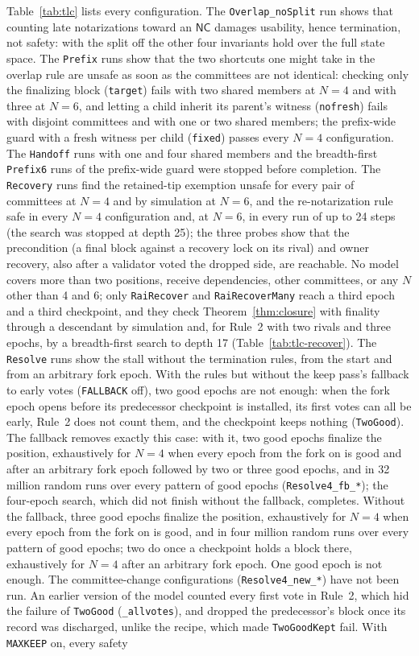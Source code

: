 \documentclass[conference]{IEEEtran}
\newcommand{\NC}{\mathsf{NC}}
\begin{document}
Table~\ref{tab:tlc} lists every configuration. The \texttt{Overlap\_noSplit} run shows that counting late notarizations toward an $\NC$ damages usability, hence termination, not safety: with the split off the other four invariants hold over the full state space. The \texttt{Prefix} runs show that the two shortcuts one might take in the overlap rule are unsafe as soon as the committees are not identical: checking only the finalizing block (\texttt{target}) fails with two shared members at $N=4$ and with three at $N=6$, and letting a child inherit its parent's witness (\texttt{nofresh}) fails with disjoint committees and with one or two shared members; the prefix-wide guard with a fresh witness per child (\texttt{fixed}) passes every $N=4$ configuration. The \texttt{Handoff} runs with one and four shared members and the breadth-first \texttt{Prefix6} runs of the prefix-wide guard were stopped before completion. The \texttt{Recovery} runs find the retained-tip exemption unsafe for every pair of committees at $N=4$ and by simulation at $N=6$, and the re-notarization rule safe in every $N=4$ configuration and, at $N=6$, in every run of up to 24 steps (the search was stopped at depth 25); the three probes show that the precondition (a final block against a recovery lock on its rival) and owner recovery, also after a validator voted the dropped side, are reachable. No model covers more than two positions, receive dependencies, other committees, or any $N$ other than 4 and 6; only \texttt{RaiRecover} and \texttt{RaiRecoverMany} reach a third epoch and a third checkpoint, and they check Theorem~\ref{thm:closure} with finality through a descendant by simulation and, for Rule~2 with two rivals and three epochs, by a breadth-first search to depth 17 (Table~\ref{tab:tlc-recover}). The \texttt{Resolve} runs show the stall without the termination rules, from the start and from an arbitrary fork epoch. With the rules but without the keep pass's fallback to early votes (\texttt{FALLBACK} off), two good epochs are not enough: when the fork epoch opens before its predecessor checkpoint is installed, its first votes can all be early, Rule~2 does not count them, and the checkpoint keeps nothing (\texttt{TwoGood}). The fallback removes exactly this case: with it, two good epochs finalize the position, exhaustively for $N=4$ when every epoch from the fork on is good and after an arbitrary fork epoch followed by two or three good epochs, and in 32 million random runs over every pattern of good epochs (\texttt{Resolve4\_fb\_*}); the four-epoch search, which did not finish without the fallback, completes. Without the fallback, three good epochs finalize the position, exhaustively for $N=4$ when every epoch from the fork on is good, and in four million random runs over every pattern of good epochs; two do once a checkpoint holds a block there, exhaustively for $N=4$ after an arbitrary fork epoch. One good epoch is not enough. The committee-change configurations (\texttt{Resolve4\_new\_*}) have not been run. An earlier version of the model counted every first vote in Rule~2, which hid the failure of \texttt{TwoGood} (\texttt{\_allvotes}), and dropped the predecessor's block once its record was discharged, unlike the recipe, which made \texttt{TwoGoodKept} fail. With \texttt{MAXKEEP} on, every safety 
\end{document}
